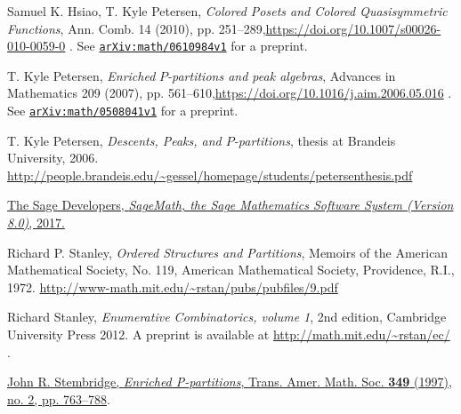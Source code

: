 \documentclass[numbers=enddot,12pt,final,onecolumn,notitlepage]{scrartcl}%
\theoremstyle{definition}
\begin{document}
\begin{thebibliography}{99999999}
Samuel K. Hsiao, T. Kyle Petersen, \textit{Colored
Posets and Colored Quasisymmetric Functions}, Ann. Comb. 14 (2010), pp.
251--289,\newline\url{https://doi.org/10.1007/s00026-010-0059-0} . See
\href{http://www.arxiv.org/abs/math/0610984v1}{\texttt{arXiv:math/0610984v1}}
for a preprint.

T. Kyle Petersen, \textit{Enriched }$\mathit{P}%
$\textit{-partitions and peak algebras}, Advances in Mathematics 209 (2007),
pp. 561--610,\newline\url{https://doi.org/10.1016/j.aim.2006.05.016} . See
\texttt{\href{https://arxiv.org/abs/math/0508041v1}{arXiv:math/0508041v1}} for
a preprint.

T. Kyle Petersen,
\textit{Descents, Peaks, and $P$-partitions},
thesis at Brandeis University,
2006.
\url{http://people.brandeis.edu/~gessel/homepage/students/petersenthesis.pdf}

\href{http://www.sagemath.org}{The Sage
Developers, \textit{SageMath, the Sage Mathematics Software System (Version
8.0)}, 2017.}

Richard P. Stanley, \textit{Ordered Structures and
Partitions}, Memoirs of the American Mathematical Society, No. 119, American
Mathematical Society, Providence, R.I., 1972. \newline\url{http://www-math.mit.edu/~rstan/pubs/pubfiles/9.pdf}

Richard Stanley, \textit{Enumerative
Combinatorics, volume 1}, 2nd edition, Cambridge University Press 2012. A
preprint is available at \url{http://math.mit.edu/~rstan/ec/} .

%
\href{http://www.ams.org/journals/tran/1997-349-02/S0002-9947-97-01804-7/}{John
R. Stembridge, \textit{Enriched P-partitions}, Trans. Amer. Math. Soc.
\textbf{349} (1997), no. 2, pp. 763--788}.
\end{thebibliography}
\end{document}
